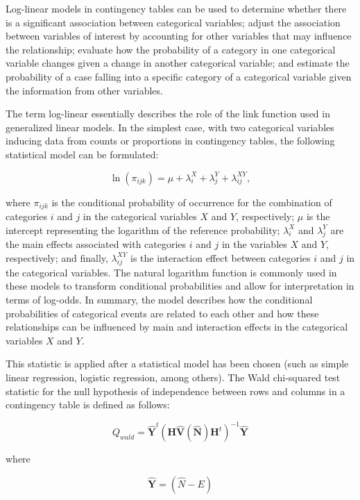 \documentclass[
  12pt,
]{book}
\begin{document}
Log-linear models in contingency tables can be used to determine whether there is a significant association between categorical variables; adjust the association between variables of interest by accounting for other variables that may influence the relationship; evaluate how the probability of a category in one categorical variable changes given a change in another categorical variable; and estimate the probability of a case falling into a specific category of a categorical variable given the information from other variables.

The term log-linear essentially describes the role of the link function used in generalized linear models. In the simplest case, with two categorical variables inducing data from counts or proportions in contingency tables, the following statistical model can be formulated:

\[
\ln(\pi_{ijk}) = \mu + \lambda_i^X + \lambda_j^Y + \lambda_{ij}^{XY},   
\]

where \(\pi_{ijk}\) is the conditional probability of occurrence for the combination of categories \(i\) and \(j\) in the categorical variables \(X\) and \(Y\), respectively; \(\mu\) is the intercept representing the logarithm of the reference probability; \(\lambda_i^X\) and \(\lambda_j^Y\) are the main effects associated with categories \(i\) and \(j\) in the variables \(X\) and \(Y\), respectively; and finally, \(\lambda_{ij}^{XY}\) is the interaction effect between categories \(i\) and \(j\) in the categorical variables. The natural logarithm function is commonly used in these models to transform conditional probabilities and allow for interpretation in terms of log-odds. In summary, the model describes how the conditional probabilities of categorical events are related to each other and how these relationships can be influenced by main and interaction effects in the categorical variables \(X\) and \(Y\).

This statistic is applied after a statistical model has been chosen (such as simple linear regression, logistic regression, among others). The Wald chi-squared test statistic for the null hypothesis of independence between rows and columns in a contingency table is defined as follows:

\[
Q_{wald} = \hat{\boldsymbol{Y}}^{t} \left(\boldsymbol{H} \hat{\boldsymbol{V}} \left(\hat{\boldsymbol{N}}\right) \boldsymbol{H}^{t}\right)^{-1} \hat{\boldsymbol{Y}}
\]

where

\[
\hat{\boldsymbol{Y}} = \left(\hat{N} - E\right)
\]
\end{document}
